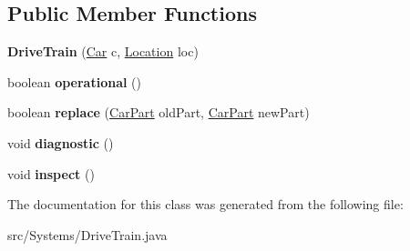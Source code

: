 \subsection*{Public Member Functions}
\begin{DoxyCompactItemize}
\item 
\hypertarget{classSystems_1_1DriveTrain_a527bae43081ca8617eaa5c29c7f14ab3}{}{\bfseries Drive\+Train} (\hyperlink{classCars_1_1Car}{Car} c, \hyperlink{enumEnums_1_1Location}{Location} loc)\label{classSystems_1_1DriveTrain_a527bae43081ca8617eaa5c29c7f14ab3}

\item 
\hypertarget{classSystems_1_1DriveTrain_a26af9fefa1f6076c5b762a919f3bc1f9}{}boolean {\bfseries operational} ()\label{classSystems_1_1DriveTrain_a26af9fefa1f6076c5b762a919f3bc1f9}

\item 
\hypertarget{classSystems_1_1DriveTrain_abc012f6fae9c4e930dfbe76b42c8c50e}{}boolean {\bfseries replace} (\hyperlink{classCars_1_1CarPart}{Car\+Part} old\+Part, \hyperlink{classCars_1_1CarPart}{Car\+Part} new\+Part)\label{classSystems_1_1DriveTrain_abc012f6fae9c4e930dfbe76b42c8c50e}

\item 
\hypertarget{classSystems_1_1DriveTrain_abb90a7b5c8b4267dd6eea45732fcc580}{}void {\bfseries diagnostic} ()\label{classSystems_1_1DriveTrain_abb90a7b5c8b4267dd6eea45732fcc580}

\item 
\hypertarget{classSystems_1_1DriveTrain_abc46e307afec231430038673ece547ef}{}void {\bfseries inspect} ()\label{classSystems_1_1DriveTrain_abc46e307afec231430038673ece547ef}

\end{DoxyCompactItemize}


The documentation for this class was generated from the following file\+:\begin{DoxyCompactItemize}
\item 
src/\+Systems/Drive\+Train.\+java\end{DoxyCompactItemize}
